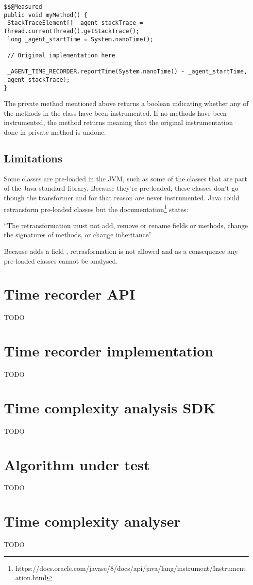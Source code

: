 \begin{lstlisting}[breaklines,caption={Method instrumentation example},label=lis:measuringclassfiletransformer:methodinstrumentationexample]
$$@Measured
public void myMethod() {
 StackTraceElement[] _agent_stackTrace = Thread.currentThread().getStackTrace();
 long _agent_startTime = System.nanoTime();

 // Original implementation here

 _AGENT_TIME_RECORDER.reportTime(System.nanoTime() - _agent_startTime, _agent_stackTrace);
}
\end{lstlisting}


\noindent The private method  mentioned above returns a boolean indicating whether any of the methods in the class have been instrumented. If no methods have been instrumented, the  method returns  meaning that the original instrumentation done in private method  is undone.

\subsection{Limitations}
\label{sec:implementation:agent:limitations}
Some classes are pre-loaded in the JVM, such as some of the classes that are part of the Java standard library. Because they're pre-loaded, these classes don't go though the transformer and for that reason are never instrumented. Java could retransform pre-loaded classes but the documentation\footnote{https://docs.oracle.com/javase/8/docs/api/java/lang/instrument/Instrumentation.html} states:

\enquote{The retransformation must not add, remove or rename fields or methods, change the signatures of methods, or change inheritance}

\noindent Because  adds a field , retrasformation is not allowed and as a consequence any pre-loaded classes cannot be analysed.

\section{Time recorder API}
\label{sec:implementation:timerecorderapi}

TODO


\section{Time recorder implementation}
\label{sec:implementation:timerecorderimplementation}

TODO


\section{Time complexity analysis SDK}

TODO


\section{Algorithm under test}

TODO


\section{Time complexity analyser}
\label{sec:implementation:timecomplexityanalyser} 
TODO
